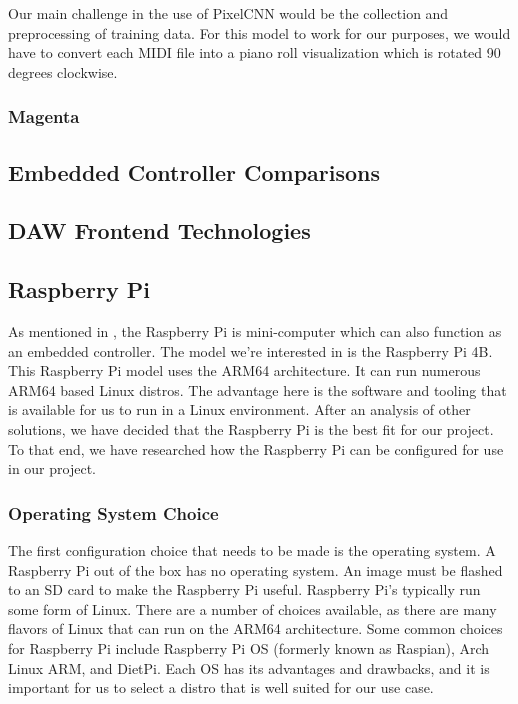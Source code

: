 Our main challenge in the use of PixelCNN would be the collection and preprocessing of
training data. For this model to work for our purposes, we would have to convert each MIDI
file into a piano roll visualization which is rotated 90 degrees clockwise.

\subsubsection{Magenta}

\blindtext

\subsection{Embedded Controller Comparisons}
\label{sec:embedded_controllers}

\blindtext

\subsection{DAW Frontend Technologies}

\blindtext

\subsection{Raspberry Pi}

As mentioned in , the Raspberry Pi is mini-computer
which can also function as an embedded controller. The model we're interested in is the
Raspberry Pi 4B. This Raspberry Pi model uses the ARM64 architecture. It can run numerous
ARM64 based Linux distros. The advantage here is the software and tooling that is
available for us to run in a Linux environment. After an analysis of other solutions, we
have decided that the Raspberry Pi is the best fit for our project. To that end, we have
researched how the Raspberry Pi can be configured for use in our project.

\subsubsection{Operating System Choice}

The first configuration choice that needs to be made is the operating system. A Raspberry
Pi out of the box has no operating system. An image must be flashed to an SD card to make
the Raspberry Pi useful. Raspberry Pi's typically run some form of Linux. There are a
number of choices available, as there are many flavors of Linux that can run on the ARM64
architecture. Some common choices for Raspberry Pi include Raspberry Pi OS (formerly known
as Raspian), Arch Linux ARM, and DietPi. Each OS has its advantages and drawbacks, and it
is important for us to select a distro that is well suited for our use case.

